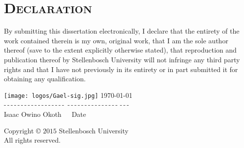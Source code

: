\chapter*{\huge\scshape  Declaration}
\vspace*{-0.5cm}
By submitting this dissertation electronically, I declare that the entirety of the work contained therein is my own, original work, that I am the sole author thereof (save to the extent explicitly otherwise stated), that reproduction and publication thereof by Stellenbosch University will not infringe any third party rights and that I have not previously in its entirety or in part submitted it for obtaining any qualification.

\vspace*{2cm}


$$ $$
$$ $$
\hspace{0.5cm}\texttt{[image: logos/Gael-sig.jpg]}  
\hspace{9.2 cm}\today \\
-\,-\,-\,-\,-\,-\,-\,-\,-\,-\,-\,-\,-\,-\,-\,-\,-\,-\, \hspace{6.2cm} -\,-\,-\,-\,-\,-\,-\,-\,-\,-\,-\,-\,-\,-\,-\,\-\,-\,-\,-\\ Isaac Owino Okoth \hspace{7.5cm}\,\,\,\,\,\,\,Date

\vfill
\begin{center}
Copyright \copyright\; $2015$ Stellenbosch University\\
All rights reserved.
\end{center}